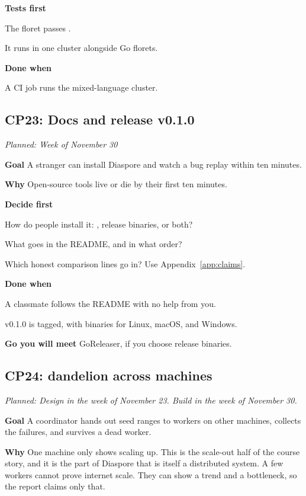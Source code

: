 \documentclass[11pt,letterpaper]{article}
\newcommand{\code}[1]{\texttt{\detokenize{#1}}}
\newcommand{\lbl}[1]{\textbf{#1}\enspace}
\newcommand{\when}[1]{\par\textit{Planned: #1}\par}
\begin{document}
\lbl{Tests first}
\begin{checks}
  \item The floret passes \code{check-determinism}.
  \item It runs in one cluster alongside Go florets.
\end{checks}

\lbl{Done when}
\begin{checks}
  \item A CI job runs the mixed-language cluster.
\end{checks}

\subsection{CP23: Docs and release v0.1.0}
\when{Week of November 30}

\lbl{Goal} A stranger can install Diaspore and watch a bug replay within ten minutes.

\lbl{Why} Open-source tools live or die by their first ten minutes.

\lbl{Decide first}
\begin{asks}
  \item How do people install it: \code{go install}, release binaries, or both?
  \item What goes in the README, and in what order?
  \item Which honest comparison lines go in? Use Appendix~\ref{app:claims}.
\end{asks}

\lbl{Done when}
\begin{checks}
  \item A classmate follows the README with no help from you.
  \item v0.1.0 is tagged, with binaries for Linux, macOS, and Windows.
\end{checks}

\lbl{Go you will meet} GoReleaser, if you choose release binaries.

\subsection{CP24: dandelion across machines}
\when{Design in the week of November 23. Build in the week of November 30.}

\lbl{Goal} A coordinator hands out seed ranges to workers on other machines, collects the failures, and survives a dead worker.

\lbl{Why} One machine only shows scaling up. This is the scale-out half of the course story, and it is the part of Diaspore that is itself a distributed system. A few workers cannot prove internet scale. They can show a trend and a bottleneck, so the report claims only that.
\end{document}
